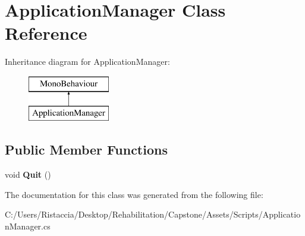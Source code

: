\hypertarget{class_application_manager}{}\section{Application\+Manager Class Reference}
\label{class_application_manager}
Inheritance diagram for Application\+Manager\+:\begin{figure}[H]
\begin{center}
\leavevmode
\includegraphics[height=2.000000cm]{class_application_manager}
\end{center}
\end{figure}
\subsection*{Public Member Functions}
\begin{DoxyCompactItemize}
\item 
\mbox{\label{class_application_manager_a5ea098d2bfc1c4dbd1c402709aa31cb8}} 
void {\bfseries Quit} ()
\end{DoxyCompactItemize}


The documentation for this class was generated from the following file\+:\begin{DoxyCompactItemize}
\item 
C\+:/\+Users/\+Ristaccia/\+Desktop/\+Rehabilitation/\+Capstone/\+Assets/\+Scripts/Application\+Manager.\+cs\end{DoxyCompactItemize}
